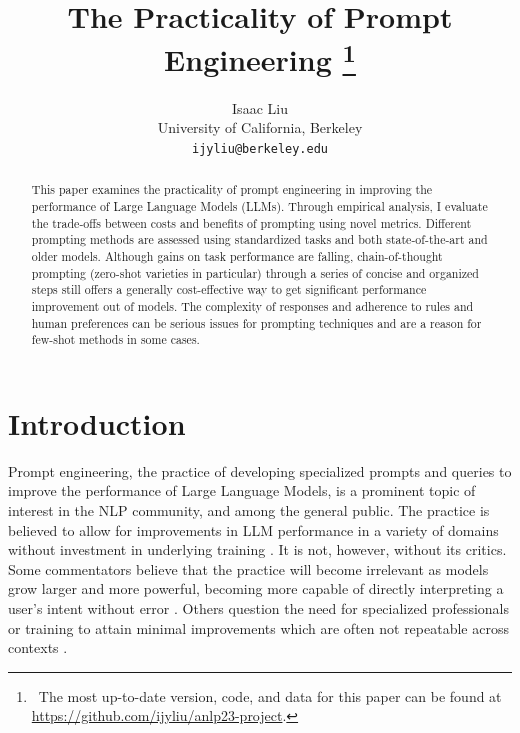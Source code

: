 \documentclass[11pt]{article}
\title{The Practicality of Prompt Engineering \thanks{~The most up-to-date version, code, and data for this paper can be found at \url{https://github.com/ijyliu/anlp23-project}.}}
\author{Isaac Liu \\
  University of California, Berkeley \\
  \texttt{ijyliu@berkeley.edu}}
\begin{document}
\maketitle

\begin{abstract}
  
  This paper examines the practicality of prompt engineering in improving the performance of Large Language Models (LLMs). Through empirical analysis, I evaluate the trade-offs between costs and benefits of prompting using novel metrics. Different prompting methods are assessed using standardized tasks and both state-of-the-art and older models. Although gains on task performance are falling, chain-of-thought prompting (zero-shot varieties in particular) through a series of concise and organized steps still offers a generally cost-effective way to get significant performance improvement out of models. The complexity of responses and adherence to rules and human preferences can be serious issues for prompting techniques and are a reason for few-shot methods in some cases.

\end{abstract}

\section*{Introduction}

Prompt engineering, the practice of developing specialized prompts and queries to improve the performance of Large Language Models, is a prominent topic of interest in the NLP community, and among the general public. The practice is believed to allow for improvements in LLM performance in a variety of domains without investment in underlying training \cite{martineau_what_2021}. It is not, however, without its critics. Some commentators believe that the practice will become irrelevant as models grow larger and more powerful, becoming more capable of directly interpreting a user's intent without error \cite{ethan_mollick_emollick_i_2023}. Others question the need for specialized professionals or training to attain minimal improvements which are often not repeatable across contexts \cite{shackell_prompt_2023, acar_ai_2023}. 
\end{document}
